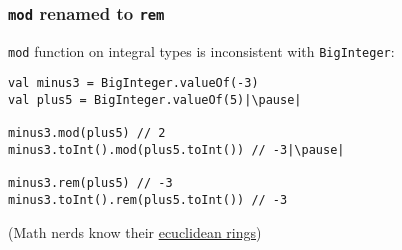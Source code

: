 \begin{frame}[fragile] \frametitle{\texttt{mod} renamed to \texttt{rem}}
 \texttt{mod} function on integral types is inconsistent with \texttt{BigInteger}:
\begin{lstlisting}
val minus3 = BigInteger.valueOf(-3)
val plus5 = BigInteger.valueOf(5)|\pause|

minus3.mod(plus5) // 2
minus3.toInt().mod(plus5.toInt()) // -3|\pause|

minus3.rem(plus5) // -3
minus3.toInt().rem(plus5.toInt()) // -3
\end{lstlisting}
\small{(Math nerds know their \href{https://www.microsoft.com/en-us/research/wp-content/uploads/2016/02/divmodnote-letter.pdf}{ecuclidean rings})}
\end{frame}
